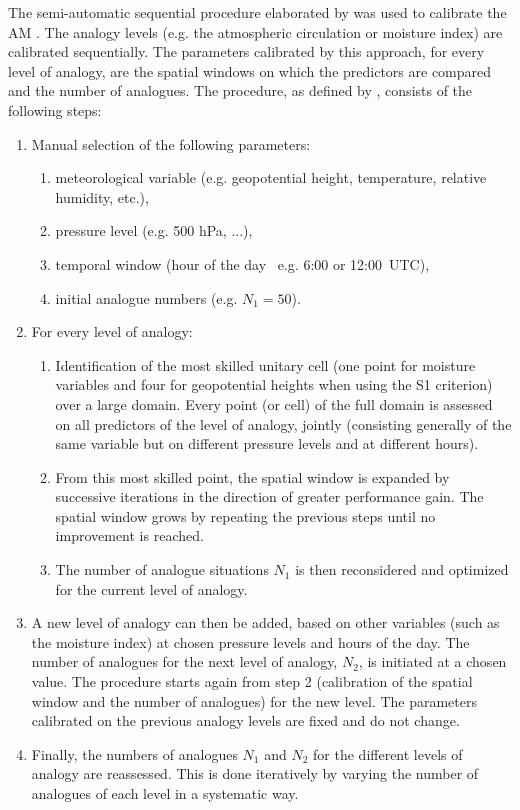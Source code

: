 \documentclass[hess, manuscript]{copernicus}
\begin{document}
	The semi-automatic sequential procedure elaborated by \citet{Bontron2004} was used to calibrate the AM \cite[see also ][]{Radanovics2013, BenDaoud2016}. The analogy levels (e.g. the atmospheric circulation or moisture index) are calibrated sequentially. The parameters calibrated by this approach, for every level of analogy, are the spatial windows on which the predictors are compared and the number of analogues. The procedure, as defined by \citet{Bontron2004}, consists of the following steps:
	
	\begin{enumerate}
		\item Manual selection of the following parameters:
		\begin{enumerate}
			\item meteorological variable (e.g. geopotential height, temperature, relative humidity, etc.),
			\item pressure level (e.g. 500 hPa, ...),
			\item temporal window (hour of the day \textendash\ e.g. 6:00 or 12:00~UTC),
			\item initial analogue numbers (e.g. $N_{1}=50$).
		\end{enumerate}
		
		\item For every level of analogy:
		\begin{enumerate}
			\item Identification of the most skilled unitary cell (one point for moisture variables and four for geopotential heights when using the S1 criterion) over a large domain. Every point (or cell) of the full domain is assessed on all predictors of the level of analogy, jointly (consisting generally of the same variable but on different pressure levels and at different hours).
			\item From this most skilled point, the spatial window is expanded by successive iterations in the direction of greater performance gain. The spatial window grows by repeating the previous steps until no improvement is reached.
			\item The number of analogue situations $N_{1}$ is then reconsidered and optimized for the current level of analogy.
		\end{enumerate}
		\item A new level of analogy can then be added, based on other variables (such as the moisture index) at chosen pressure levels and hours of the day. The number of analogues for the next level of analogy, $N_{2}$, is initiated at a chosen value. The procedure starts again from step 2 (calibration of the spatial window and the number of analogues) for the new level. The parameters calibrated on the previous analogy levels are fixed and do not change. 
		\item Finally, the numbers of analogues $N_{1}$ and $N_{2}$ for the different levels of analogy are reassessed. This is done iteratively by varying the number of analogues of each level in a systematic way.
	\end{enumerate}
	
\end{document}
